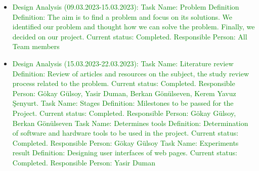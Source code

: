 \documentclass[conference]{IEEEtran}
\begin{document}
\begin{itemize}



  \item \textcolor{green} { Design Analysis (09.03.2023-15.03.2023):\newline\newline
  Task Name: Problem Definition\newline
  Definition: The aim is to find a problem and focus on its solutions. We identified our problem and thought how we can solve the problem. Finally, we decided on our project.\newline
  Current status: Completed.\newline
  Responsible Person: All Team members\newline
  }

  
  \item  \textcolor{green} { Design Analysis (15.03.2023-22.03.2023):\newline\newline
  Task Name: Literature review\newline
  Definition: Review of articles and resources on the subject, the study review process related to the problem.\newline
  Current status: Completed.\newline
  Responsible Person: Gökay Gülsoy, Yasir Duman, Berkan Gönülseven, Kerem Yavuz Şenyurt.\newline\newline
  Task Name: Stages\newline
  Definition: Milestones to be passed for the Project.\newline
  Current status: Completed.\newline
  Responsible Person: Gökay Gülsoy, Berkan Gönülseven\newline\newline
  Task Name: Determines tools\newline
  Definition: Determination of software and hardware tools to be used in the project.\newline
  Current status: Completed.\newline
  Responsible Person: Gökay Gülsoy\newline\newline
  Task Name: Experiments result\newline
  Definition: Designing user interfaces of web pages.\newline
  Current status: Completed.\newline
  Responsible Person: Yasir Duman\newline}
  

\end{itemize}
\end{document}
